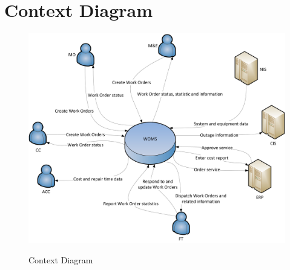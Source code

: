 \appendix
\section{Context Diagram}
\begin{figure}[!h]
	\vspace{1cm}
	\includegraphics[scale = 0.7, angle = 90]{images/context_diagram.png}
	\label{appendix_a_context_diagram}
	\caption{Context Diagram}
\end{figure}
